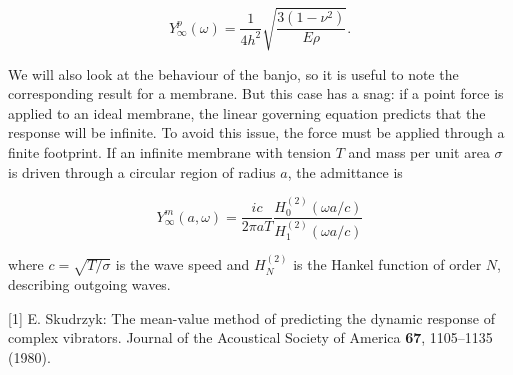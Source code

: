   \begin{equation*}Y_\infty^{p} (\omega)=\frac{1}{4h^2} 
  \sqrt{\frac{3(1-\nu^2)}{E \rho}} . \tag{2}\end{equation*} 

  We will also look at the behaviour of the banjo, so it is useful to note the 
  corresponding result for a membrane. But this case has a snag: if a point 
  force is applied to an ideal membrane, the linear governing equation predicts 
  that the response will be infinite. To avoid this issue, the force must be 
  applied through a finite footprint. If an infinite membrane with tension $T$ 
  and mass per unit area $\sigma$ is driven through a circular region of radius 
  $a$, the admittance is 

  \begin{equation*}Y_\infty^{m} (a,\omega)=\frac{ic}{2 \pi a T} \frac{H^{(2)}_0 
  (\omega a/c)}{H^{(2)}_1 (\omega a/c)} \tag{3}\end{equation*} 

  \noindent{}where $c=\sqrt{T/\sigma}$ is the wave speed and $H^{(2)}_N$ is the 
  Hankel function of order $N$, describing outgoing waves. 

  \sectionreferences{}[1] E. Skudrzyk: The mean-value method of predicting the 
  dynamic response of complex vibrators. Journal of the Acoustical Society of 
  America \textbf{67}, 1105–1135 (1980). 